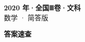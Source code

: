 \documentclass[zihao=-4, a4paper]{ctexart}
\begin{document}
\begin{center}
  {\Large\bfseries 2020 年·全国Ⅲ卷·文科}\\[4pt]
  {\large 数学 · 简答版}
\end{center}
\medskip
{}

\clearpage
{}
\begin{center}{\Large\bfseries 答案速查}\end{center}
\medskip

\end{document}
